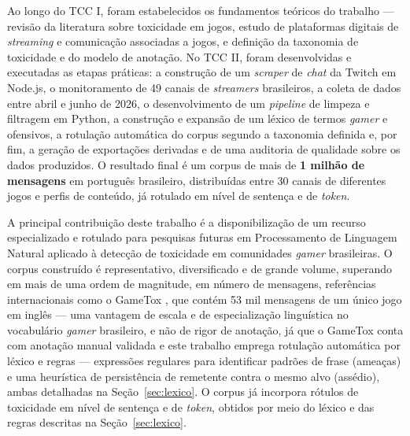 \documentclass{eic-bcc-tcc}
\begin{document}
Ao longo do TCC I, foram estabelecidos os fundamentos teóricos do trabalho — revisão da literatura sobre toxicidade em jogos, estudo de plataformas digitais de \textit{streaming} e comunicação associadas a jogos, e definição da taxonomia de toxicidade e do modelo de anotação. No TCC II, foram desenvolvidas e executadas as etapas práticas: a construção de um \textit{scraper} de \textit{chat} da Twitch em Node.js, o monitoramento de 49 canais de \textit{streamers} brasileiros, a coleta de dados entre abril e junho de 2026, o desenvolvimento de um \textit{pipeline} de limpeza e filtragem em Python, a construção e expansão de um léxico de termos \textit{gamer} e ofensivos, a rotulação automática do corpus segundo a taxonomia definida e, por fim, a geração de exportações derivadas e de uma auditoria de qualidade sobre os dados produzidos. O resultado final é um corpus de mais de \textbf{1 milhão de mensagens} em português brasileiro, distribuídas entre 30 canais de diferentes jogos e perfis de conteúdo, já rotulado em nível de sentença e de \textit{token}.

A principal contribuição deste trabalho é a disponibilização de um recurso especializado e rotulado para pesquisas futuras em Processamento de Linguagem Natural aplicado à detecção de toxicidade em comunidades \textit{gamer} brasileiras. O corpus construído é representativo, diversificado e de grande volume, superando em mais de uma ordem de magnitude, em número de mensagens, referências internacionais como o GameTox \cite{naseem-etal-2025-gametox}, que contém 53 mil mensagens de um único jogo em inglês — uma vantagem de escala e de especialização linguística no vocabulário \textit{gamer} brasileiro, e não de rigor de anotação, já que o GameTox conta com anotação manual validada e este trabalho emprega rotulação automática por léxico e regras — expressões regulares para identificar padrões de frase (ameaças) e uma heurística de persistência de remetente contra o mesmo alvo (assédio), ambas detalhadas na Seção~\ref{sec:lexico}. O corpus já incorpora rótulos de toxicidade em nível de sentença e de \textit{token}, obtidos por meio do léxico e das regras descritas na Seção~\ref{sec:lexico}.
\end{document}
